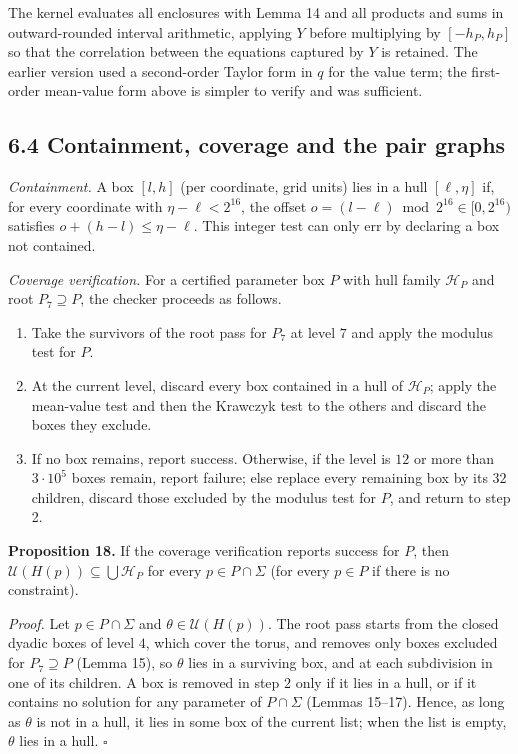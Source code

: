 \documentclass[
  11pt,
]{article}
\providecommand{\tightlist}{%
  \setlength{\itemsep}{0pt}\setlength{\parskip}{0pt}}
\begin{document}
The kernel evaluates all enclosures with Lemma 14 and all products and
sums in outward-rounded interval arithmetic, applying \(Y\) before
multiplying by \([-h_P,h_P]\) so that the correlation between the
equations captured by \(Y\) is retained. The earlier version used a
second-order Taylor form in \(q\) for the value term; the first-order
mean-value form above is simpler to verify and was sufficient.

\subsection{6.4 Containment, coverage and the pair
graphs}\label{containment-coverage-and-the-pair-graphs}

\emph{Containment.} A box \([l,h]\) (per coordinate, grid units) lies in
a hull \([\ell,\eta]\) if, for every coordinate with
\(\eta-\ell<2^{16}\), the offset \(o=(l-\ell)\bmod2^{16}\in[0,2^{16})\)
satisfies \(o+(h-l)\le\eta-\ell\). This integer test can only err by
declaring a box not contained.

\emph{Coverage verification.} For a certified parameter box \(P\) with
hull family \(\mathcal H_P\) and root \(P_7\supseteq P\), the checker
proceeds as follows.

\begin{enumerate}
\def\labelenumi{\arabic{enumi}.}
\tightlist
\item
  Take the survivors of the root pass for \(P_7\) at level \(7\) and
  apply the modulus test for \(P\).
\item
  At the current level, discard every box contained in a hull of
  \(\mathcal H_P\); apply the mean-value test and then the Krawczyk test
  to the others and discard the boxes they exclude.
\item
  If no box remains, report success. Otherwise, if the level is \(12\)
  or more than \(3\cdot10^5\) boxes remain, report failure; else replace
  every remaining box by its \(32\) children, discard those excluded by
  the modulus test for \(P\), and return to step 2.
\end{enumerate}

\textbf{Proposition 18.} If the coverage verification reports success
for \(P\), then \(\mathcal U(H(p))\subseteq\bigcup\mathcal H_P\) for
every \(p\in P\cap\Sigma\) (for every \(p\in P\) if there is no
constraint).

\emph{Proof.} Let \(p\in P\cap\Sigma\) and
\(\theta\in\mathcal U(H(p))\). The root pass starts from the closed
dyadic boxes of level \(4\), which cover the torus, and removes only
boxes excluded for \(P_7\supseteq P\) (Lemma 15), so \(\theta\) lies in
a surviving box, and at each subdivision in one of its children. A box
is removed in step 2 only if it lies in a hull, or if it contains no
solution for any parameter of \(P\cap\Sigma\) (Lemmas 15--17). Hence, as
long as \(\theta\) is not in a hull, it lies in some box of the current
list; when the list is empty, \(\theta\) lies in a hull. \(\square\)
\end{document}
